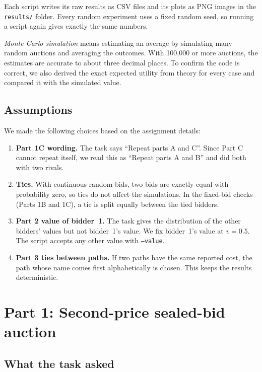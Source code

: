 \documentclass[11pt,a4paper]{article}
\begin{document}
Each script writes its raw results as CSV files and its plots as PNG images in the \texttt{results/} folder. Every random experiment uses a fixed random seed, so running a script again gives exactly the same numbers.

\emph{Monte Carlo simulation} means estimating an average by simulating many random auctions and averaging the outcomes. With 100,000 or more auctions, the estimates are accurate to about three decimal places. To confirm the code is correct, we also derived the exact expected utility from theory for every case and compared it with the simulated value.

\subsection{Assumptions}

We made the following choices based on the assignment details:

\begin{enumerate}
  \item \textbf{Part 1C wording.} The task says ``Repeat parts A and C''. Since Part C cannot repeat itself, we read this as ``Repeat parts A and B'' and did both with two rivals.
  \item \textbf{Ties.} With continuous random bids, two bids are exactly equal with probability zero, so ties do not affect the simulations. In the fixed-bid checks (Parts 1B and 1C), a tie is split equally between the tied bidders.
  \item \textbf{Part 2 value of bidder~1.} The task gives the distribution of the other bidders' values but not bidder~1's value. We fix bidder~1's value at $v=0.5$. The script accepts any other value with \texttt{--value}.
  \item \textbf{Part 3 ties between paths.} If two paths have the same reported cost, the path whose name comes first alphabetically is chosen. This keeps the results deterministic.
\end{enumerate}

\section{Part 1: Second-price sealed-bid auction}

\subsection{What the task asked}
\end{document}
